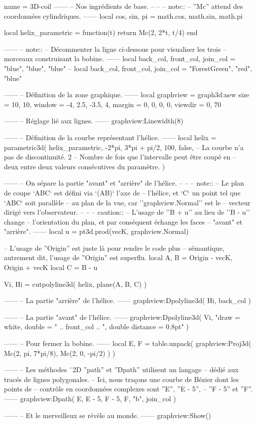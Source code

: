\documentclass[varwidth]{standalone}
\begin{document}
\begin{luadraw}{name = 3D-coil}
------
-- Nos ingrédients de base.
--
--
-- note::
--     ''Mc'' attend des coordonnées cylindriques.
------
local cos, sin, pi = math.cos, math.sin, math.pi

local helix_parametric = function(t)
  return Mc(2, 2*t, t/4)
end

------
-- note::
--     Décommenter la ligne ci-dessous pour visualiser les trois
--     morceaux construisant la bobine.
------
local back_col, front_col, join_col = "blue", "blue", "blue"
-- local back_col, front_col, join_col = "ForestGreen", "red", "blue"

------
-- Définition de la zone graphique.
------
local graphview = graph3d:new{
  size    = {10, 10},
  window  = {-4, 2.5, -3.5, 4},
  margin  = {0, 0, 0, 0},
  viewdir = {0, 70}
}

------
-- Réglage lié aux lignes.
------
graphview:Linewidth(8)

------
-- Définition de la courbe représentant l'hélice.
------
local helix = parametric3d(
  helix_parametric,
  -2*pi, 3*pi + pi/2,
  100,
  false,  -- La courbe n'a pas de discontinuité.
  2       -- Nombre de fois que l’intervalle peut être coupé en
          -- deux entre deux valeurs consécutives du paramètre.
)

------
-- On sépare la partie "avant" et "arrière" de l'hélice.
--
--
-- note::
--     Le plan de coupe `ABC` est défini via `(AB)` l'axe de
--     l'hélice, et `C` un point tel que `ABC` soit parallèle
--     au plan de la vue, car ''graphview.Normal'' est le
--     vecteur dirigé vers l'observateur.
--
--
-- caution::
--     L'usage de ''B + u'' au lieu de ''B - u'' change
--     l'orientation du plan, et par conséquent échange les faces
--     "avant" et "arrière".
------
local u = pt3d.prod(vecK, graphview.Normal)

-- L'usage de ''Origin'' est juste là pour rendre le code plus
-- sémantique, autrement dit, l'usage de ''Origin'' est superflu.
local A, B = Origin - vecK, Origin + vecK
local C    = B - u

Vi, Hi = cutpolyline3d(
  helix,
  plane(A, B, C)
)

------
-- La partie "arrière" de l'hélice.
------
graphview:Dpolyline3d(
  Hi,
  back_col
)

------
-- La partie "avant" de l'hélice.
------
graphview:Dpolyline3d(
  Vi,
     "draw = white, double = " .. front_col
  .. ", double distance = 0.8pt"
)

------
-- Pour fermer la bobine.
------
local E, F = table.unpack(
  graphview:Proj3d({
    Mc(2, pi, 7*pi/8),
    Mc(2, 0, -pi/2)
  })
)

------
-- Les méthodes ¨2D ''path'' et ''Dpath'' utilisent un langage
-- dédié aux tracés de lignes polygonales.
-- Ici, nous traçons une courbe de Bézier dont les points de
-- contrôle en coordonnées complexes sont ''E'', ''E - 5'',
-- ''F - 5'' et ''F''.
------
graphview:Dpath(
  {E, E - 5, F - 5, F, "b"},
  join_col
)

------
-- Et le merveilleux se révèle au monde.
------
graphview:Show()
\end{luadraw}
\end{document}
